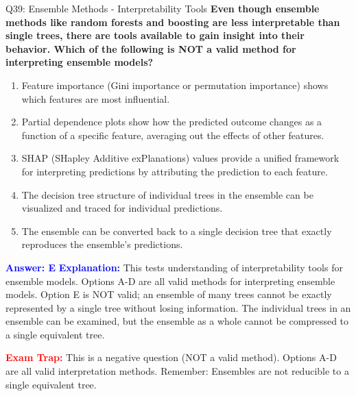 \documentclass[8pt]{beamer}
\begin{document}
	\begin{frame}{Q39: Ensemble Methods - Interpretability Tools}
		\fontsize{6.5}{7.5}\selectfont
		\textbf{Even though ensemble methods like random forests and boosting are less interpretable than single trees, there are tools available to gain insight into their behavior. Which of the following is NOT a valid method for interpreting ensemble models?}
		
		\begin{enumerate}
			\item Feature importance (Gini importance or permutation importance) shows which features are most influential.
			\item Partial dependence plots show how the predicted outcome changes as a function of a specific feature, averaging out the effects of other features.
			\item SHAP (SHapley Additive exPlanations) values provide a unified framework for interpreting predictions by attributing the prediction to each feature.
			\item The decision tree structure of individual trees in the ensemble can be visualized and traced for individual predictions.
			\item The ensemble can be converted back to a single decision tree that exactly reproduces the ensemble's predictions.
		\end{enumerate}
		
		\vspace{0.1cm}
		\textcolor{blue}{\textbf{Answer: E}}
		\vspace{0.1cm}
		\textcolor{blue}{\textbf{Explanation:}} This tests understanding of interpretability tools for ensemble models. Options A-D are all valid methods for interpreting ensemble models. Option E is NOT valid; an ensemble of many trees cannot be exactly represented by a single tree without losing information. The individual trees in an ensemble can be examined, but the ensemble as a whole cannot be compressed to a single equivalent tree.
		
		\textcolor{red}{\textbf{Exam Trap:}} This is a negative question (NOT a valid method). Options A-D are all valid interpretation methods. Remember: Ensembles are not reducible to a single equivalent tree.
	\end{frame}
	
\end{document}
